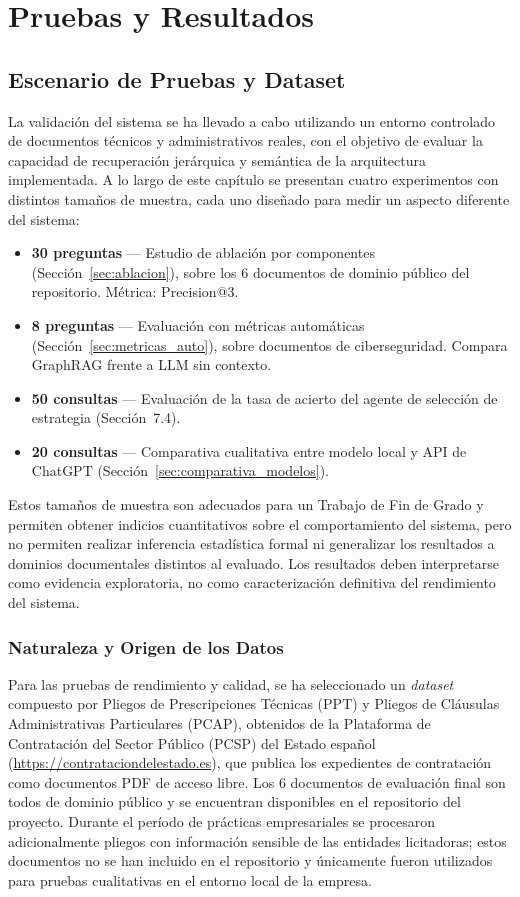 \chapter{Pruebas y Resultados}\label{cap7}

\section{Escenario de Pruebas y Dataset}

La validación del sistema se ha llevado a cabo utilizando un entorno controlado de documentos técnicos y administrativos reales, con el objetivo de evaluar la capacidad de recuperación jerárquica y semántica de la arquitectura implementada. A lo largo de este capítulo se presentan cuatro experimentos con distintos tamaños de muestra, cada uno diseñado para medir un aspecto diferente del sistema:

\begin{itemize}
    \item \textbf{30 preguntas} — Estudio de ablación por componentes (Sección~\ref{sec:ablacion}), sobre los 6 documentos de dominio público del repositorio. Métrica: Precision@3.
    \item \textbf{8 preguntas} — Evaluación con métricas automáticas (Sección~\ref{sec:metricas_auto}), sobre documentos de ciberseguridad. Compara GraphRAG frente a LLM sin contexto.
    \item \textbf{50 consultas} — Evaluación de la tasa de acierto del agente de selección de estrategia (Sección~7.4).
    \item \textbf{20 consultas} — Comparativa cualitativa entre modelo local y API de ChatGPT (Sección~\ref{sec:comparativa_modelos}).
\end{itemize}

Estos tamaños de muestra son adecuados para un Trabajo de Fin de Grado y permiten obtener indicios cuantitativos sobre el comportamiento del sistema, pero no permiten realizar inferencia estadística formal ni generalizar los resultados a dominios documentales distintos al evaluado. Los resultados deben interpretarse como evidencia exploratoria, no como caracterización definitiva del rendimiento del sistema.

\subsection{Naturaleza y Origen de los Datos}
Para las pruebas de rendimiento y calidad, se ha seleccionado un \textit{dataset} compuesto por Pliegos de Prescripciones Técnicas (PPT) y Pliegos de Cláusulas Administrativas Particulares (PCAP), obtenidos de la Plataforma de Contratación del Sector Público (PCSP) del Estado español (\url{https://contrataciondelestado.es}), que publica los expedientes de contratación como documentos PDF de acceso libre. Los 6 documentos de evaluación final son todos de dominio público y se encuentran disponibles en el repositorio del proyecto. Durante el período de prácticas empresariales se procesaron adicionalmente pliegos con información sensible de las entidades licitadoras; estos documentos no se han incluido en el repositorio y únicamente fueron utilizados para pruebas cualitativas en el entorno local de la empresa.

